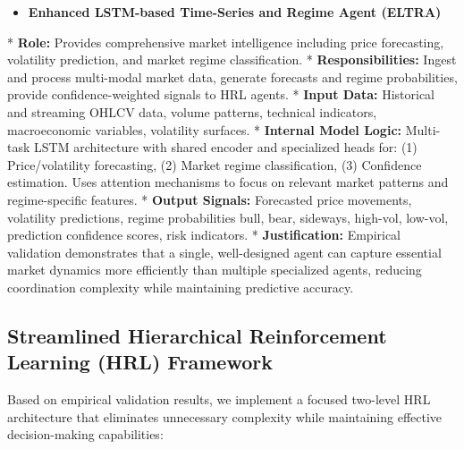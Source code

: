 \documentclass[11pt,a4paper]{article}
\begin{document}
\begin{itemize}
\item   \textbf{Enhanced LSTM-based Time-Series and Regime Agent (ELTRA)}
\end{itemize}
    *   \textbf{Role:} Provides comprehensive market intelligence including price forecasting, volatility prediction, and market regime classification.
    *   \textbf{Responsibilities:} Ingest and process multi-modal market data, generate forecasts and regime probabilities, provide confidence-weighted signals to HRL agents.
    *   \textbf{Input Data:} Historical and streaming OHLCV data, volume patterns, technical indicators, macroeconomic variables, volatility surfaces.
    *   \textbf{Internal Model Logic:} Multi-task LSTM architecture with shared encoder and specialized heads for: (1) Price/volatility forecasting, (2) Market regime classification, (3) Confidence estimation. Uses attention mechanisms to focus on relevant market patterns and regime-specific features.
    *   \textbf{Output Signals:} Forecasted price movements, volatility predictions, regime probabilities {bull, bear, sideways, high-vol, low-vol}, prediction confidence scores, risk indicators.
    *   \textbf{Justification:} Empirical validation demonstrates that a single, well-designed agent can capture essential market dynamics more efficiently than multiple specialized agents, reducing coordination complexity while maintaining predictive accuracy.

\subsection{Streamlined Hierarchical Reinforcement Learning (HRL) Framework}

Based on empirical validation results, we implement a focused two-level HRL architecture that eliminates unnecessary complexity while maintaining effective decision-making capabilities:
\end{document}
